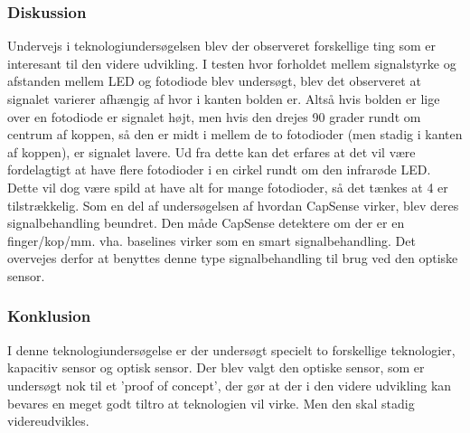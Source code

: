 \documentclass[HardwareDesign/HardwareDesign_main.tex]{subfiles}
\begin{document}
\subsubsection{Diskussion} \label{sec:CupSensorTekUnderDiskussion}
Undervejs i teknologiundersøgelsen blev der observeret forskellige ting som er interesant til den videre udvikling. 
I testen hvor forholdet mellem signalstyrke og afstanden mellem LED og fotodiode blev undersøgt, blev det observeret at signalet varierer afhængig af hvor i kanten bolden er. Altså hvis bolden er lige over en fotodiode er signalet højt, men hvis den drejes 90 grader rundt om centrum af koppen, så den er midt i mellem de to fotodioder (men stadig i kanten af koppen), er signalet lavere. Ud fra dette kan det erfares at det vil være fordelagtigt at have flere fotodioder i en cirkel rundt om den infrarøde LED. Dette vil dog være spild at have alt for mange fotodioder, så det tænkes at 4 er tilstrækkelig.
Som en del af undersøgelsen af hvordan CapSense virker, blev deres signalbehandling beundret. Den måde CapSense detektere om der er en finger/kop/mm. vha. baselines virker som en smart signalbehandling. Det overvejes derfor at benyttes denne type signalbehandling til brug ved den optiske sensor.

\subsubsection{Konklusion} \label{sec:CupSensorTekUnderKonklusion}
I denne teknologiundersøgelse er der undersøgt specielt to forskellige teknologier, kapacitiv sensor og optisk sensor. Der blev valgt den optiske sensor, som er undersøgt nok til et 'proof of concept', der gør at der i den videre udvikling kan bevares en meget godt tiltro at teknologien vil virke. Men den skal stadig videreudvikles.
\end{document}

